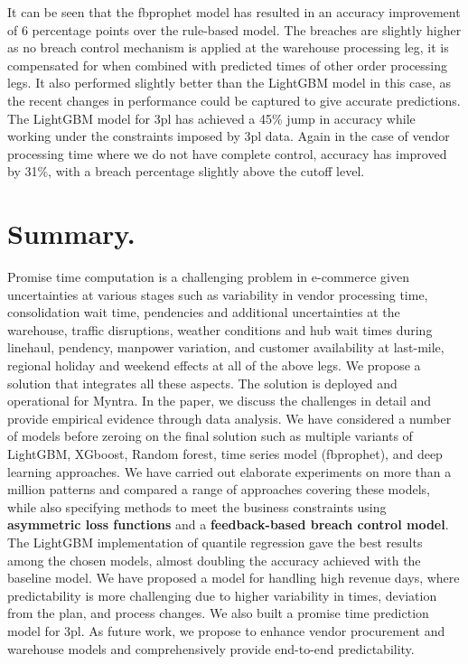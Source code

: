\documentclass[twoside,leqno,twocolumn]{article}
\begin{document}
It can be seen that the fbprophet model has resulted in an accuracy improvement of 6 percentage points over the rule-based model. The breaches are slightly higher as no breach control mechanism is applied at the warehouse processing leg, it is compensated for when combined with predicted times of other order processing legs. It also performed slightly better than the LightGBM model in this case, as the recent changes in performance could be captured to give accurate predictions. The LightGBM model for 3pl has achieved a 45\% jump in accuracy while working under the constraints imposed by 3pl data. Again in the case of vendor processing time where we do not have complete control, accuracy has improved by 31\%, with a breach percentage slightly above the cutoff level.

\section{Summary.}
Promise time computation is a challenging problem in e-commerce given uncertainties at various stages such as variability in vendor processing time, consolidation wait time, pendencies and additional uncertainties at the warehouse, traffic disruptions, weather conditions and hub wait times during linehaul, pendency, manpower variation, and customer availability at last-mile, regional holiday and weekend effects at all of the above legs. We propose a solution that integrates all these aspects. The solution is deployed and operational for Myntra. In the paper, we discuss the challenges in detail and provide empirical evidence through data analysis. We have considered a number of models before zeroing on the final solution such as multiple variants of LightGBM, XGboost, Random forest, time series model (fbprophet), and deep learning approaches.  We have carried out elaborate experiments on more than a million patterns and compared a range of approaches covering these models, while also specifying methods to meet the business constraints using \textbf{asymmetric loss functions} and a \textbf{feedback-based breach control model}. The LightGBM implementation of quantile regression gave the best results among the chosen models, almost doubling the accuracy achieved with the baseline model. We have proposed a model for handling high revenue days, where predictability is more challenging due to higher variability in times, deviation from the plan, and process changes. We also built a promise time prediction model for 3pl. As future work, we propose to enhance vendor procurement and warehouse models and comprehensively provide end-to-end predictability.
\end{document}
